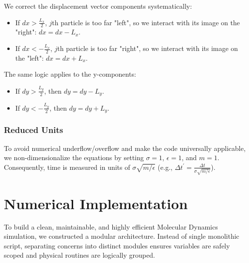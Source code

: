 \documentclass[12pt, a4paper, oneside]{article}
\begin{document}
            We correct the displacement vector components systematically:
            \begin{itemize}
                \item If $dx > \frac{L_x}{2}$, $j$th particle is too far "left", so we interact with its image on the "right": $dx = dx - L_x$.
                \item If $dx < -\frac{L_x}{2}$, $j$th particle is too far "right", so we interact with its image on the "left": $dx = dx + L_x$.
            \end{itemize}
            The same logic applies to the y-components:
            \begin{itemize}
                \item If $dy > \frac{L_y}{2}$, then $dy = dy - L_y$.
                \item If $dy < -\frac{L_y}{2}$, then $dy = dy + L_y$.
            \end{itemize}

            \subsubsection{Reduced Units}
            To avoid numerical underflow/overflow and make the code universally applicable, we non-dimensionalize the equations by setting $\sigma = 1$, $\epsilon = 1$, and $m = 1$. Consequently, time is measured in units of $\sigma \sqrt{m / \epsilon}$ (e.g., $\Delta t ^\prime = \frac{\Delta t}{\sigma \sqrt{m / \epsilon}}$).

    \section{Numerical Implementation}
        To build a clean, maintainable, and highly efficient Molecular Dynamics simulation, we constructed a modular architecture. Instead of single monolithic script, separating concerns into distinct modules ensures variables are safely scoped and physical routines are logically grouped.
\end{document}
